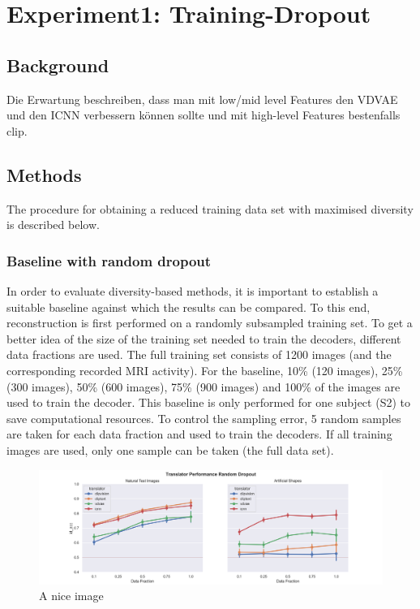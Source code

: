 \section{Experiment1: Training-Dropout}
\subsection{Background}


Die Erwartung beschreiben, dass man mit low/mid level Features den VDVAE und den ICNN verbessern können sollte und mit high-level Features bestenfalls clip.

\subsection{Methods}

The procedure for obtaining a reduced training data set with maximised diversity is described below.

\subsubsection{Baseline with random dropout}

In order to evaluate diversity-based methods, it is important to establish a suitable baseline against which the results can be compared. To this end, reconstruction is first performed on a randomly subsampled training set. To get a better idea of the size of the training set needed to train the decoders, different data fractions are used. The full training set consists of 1200 images (and the corresponding recorded MRI activity). For the baseline, 10\% (120 images), 25\% (300 images), 50\% (600 images), 75\% (900 images) and 100\% of the images are used to train the decoder. This baseline is only performed for one subject (S2) to save computational resources. To control the sampling error, 5 random samples are taken for each data fraction and used to train the decoders. If all training images are used, only one sample can be taken (the full data set). 


\begin{figure}[ht]
    \centering
    \includegraphics[width=1\textwidth]{plots/dropout_random_translator.png}
    \caption{A nice image}\label{fig:dropout_random_translator}
\end{figure}

